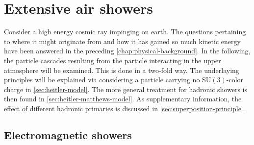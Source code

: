 
\chapter{Extensive air showers}
\label{chapter:extensive-air-showers}

Consider a high energy cosmic ray impinging on earth. The questions pertaining to where it might originate from and how it has gained so much kinetic energy have 
been answered in the preceding \autoref{chap:physical-background}. In the following, the particle cascades resulting from the particle interacting in the upper
atmosphere will be examined. This is done in a two-fold way. The underlaying principles will be explained via considering a particle carrying no SU$(3)$-color 
charge in \autoref{sec:heitler-model}. The more general treatment for hadronic showers is then found in \autoref{sec:heitler-matthews-model}. As supplementary 
information, the effect of different hadronic primaries is discussed in \autoref{sec:superposition-principle}.

\section{Electromagnetic showers}
\label{sec:heitler-model}

